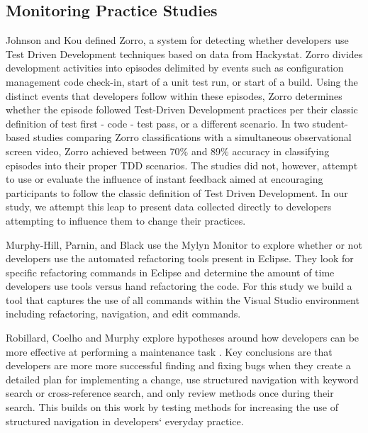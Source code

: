 \documentclass{sig-alternate}
\begin{document}
\subsection{Monitoring Practice Studies }
Johnson and Kou defined Zorro\cite{V:Johnson2007Automated}, a system for detecting whether developers use Test Driven Development techniques based on data from Hackystat.  Zorro divides development activities into episodes delimited by events such as configuration management code check-in, start of a unit test run, or start of a build.  Using the distinct events that developers follow within these episodes, Zorro determines whether the episode followed Test-Driven Development practices per their classic definition of test first - code - test pass, or a different scenario.  In two student-based studies comparing Zorro classifications with a simultaneous observational screen video, Zorro achieved between 70\% \cite{Kou2010Operational} and 89\% \cite{V:Johnson2007Automated} accuracy in classifying episodes into their proper TDD scenarios.  The studies did not, however, attempt to use or evaluate the influence of instant feedback aimed at encouraging participants to follow the classic definition of Test Driven Development.  In our study, we attempt this leap to present data collected directly to developers attempting to influence them to change their practices.

Murphy-Hill, Parnin, and Black \cite{V:MurphyHill2012How} use the Mylyn Monitor to explore whether or not developers use the automated refactoring tools present in Eclipse.  They look for specific refactoring commands in Eclipse and determine the amount of time developers use tools versus hand refactoring the code.  For this study we build a tool that captures the use of all commands within the Visual Studio environment including refactoring, navigation, and edit commands.

Robillard, Coelho and Murphy explore hypotheses around how developers can be more effective at performing a maintenance task \cite{wbsnipes:Robillard2004How}.  Key conclusions are that developers are more more successful finding and fixing bugs when they create a detailed plan for implementing a change, use structured navigation with keyword search or cross-reference search, and only review methods once during their search.  This builds on this work by testing methods for increasing the use of structured navigation in developers` everyday practice.
\end{document}
